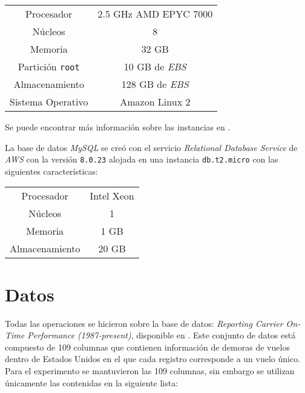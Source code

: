 \begin{center}
\begin{tabular}{|c|c|}
 \hline
  Procesador & 2.5 GHz AMD EPYC 7000 \\ 
  Núcleos & 8 \\
  Memoria & 32 GB \\ 
  Partición \texttt{root} & 10 GB de \textit{EBS}  \\
  Almacenamiento & 128 GB de \textit{EBS}  \\ 
  Sistema Operativo & Amazon Linux 2 \\
  \hline
\end{tabular}
\end{center}

Se puede encontrar más información sobre las instancias en \cite{ec2-instances}.

La base de datos \textit{MySQL} se creó con el servicio \textit{Relational Database Service} de \textit{AWS} con la versión \texttt{8.0.23} alojada en una instancia \texttt{db.t2.micro} con las siguientes características:

\begin{center}
\begin{tabular}{|c|c|}
 \hline
  Procesador & Intel Xeon \\ 
  Núcleos & 1 \\
  Memoria & 1 GB \\
  Almacenamiento & 20 GB  \\ 
  \hline
\end{tabular}
\end{center}

\section{Datos}

Todas las operaciones se hicieron sobre la base de datos: 
\textit{Reporting Carrier On-Time Performance (1987-present)}, disponible en \cite{linktranstat}. Este conjunto de datos está compuesto de 109 columnas que contienen información de demoras de vuelos dentro de Estados Unidos en el que cada registro corresponde a un vuelo único. Para el experimento se mantuvieron las 109 columnas, sin embargo se utilizan únicamente las contenidas en la siguiente lista:

